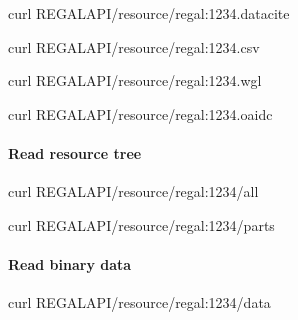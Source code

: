 \documentclass[letterpaper,10pt,english]{sphinxmanual}
\begin{document}
\begin{sphinxVerbatim}[commandchars=\\\{\}]
curl \PYGZdl{}REGAL\PYGZus{}API/resource/regal:1234.datacite
\end{sphinxVerbatim}

\sphinxAtStartPar
{}

\begin{sphinxVerbatim}[commandchars=\\\{\}]
curl \PYGZdl{}REGAL\PYGZus{}API/resource/regal:1234.csv
\end{sphinxVerbatim}

\sphinxAtStartPar
{}

\begin{sphinxVerbatim}[commandchars=\\\{\}]
curl \PYGZdl{}REGAL\PYGZus{}API/resource/regal:1234.wgl
\end{sphinxVerbatim}

\sphinxAtStartPar
{}

\begin{sphinxVerbatim}[commandchars=\\\{\}]
curl \PYGZdl{}REGAL\PYGZus{}API/resource/regal:1234.oaidc
\end{sphinxVerbatim}


\paragraph{Read resource tree}
\label{\detokenize{api-toscience:read-resource-tree}}\label{\detokenize{api-toscience:id11}}
\begin{sphinxVerbatim}[commandchars=\\\{\}]
curl \PYGZdl{}REGAL\PYGZus{}API/resource/regal:1234/all
\end{sphinxVerbatim}

\begin{sphinxVerbatim}[commandchars=\\\{\}]
curl \PYGZdl{}REGAL\PYGZus{}API/resource/regal:1234/parts
\end{sphinxVerbatim}


\paragraph{Read binary data}
\label{\detokenize{api-toscience:read-binary-data}}\label{\detokenize{api-toscience:id12}}
\begin{sphinxVerbatim}[commandchars=\\\{\}]
curl \PYGZdl{}REGAL\PYGZus{}API/resource/regal:1234/data
\end{sphinxVerbatim}
\end{document}
